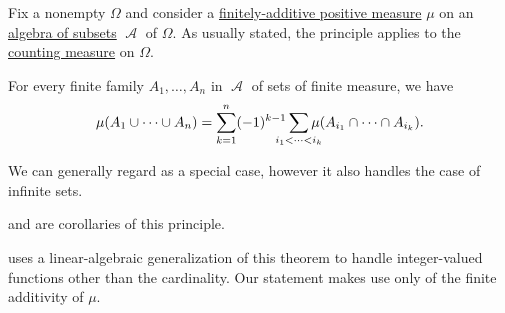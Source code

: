 \begin{theorem}\label{thm:inclusion_exclusion_principle}
  Fix a nonempty \( \Omega \) and consider a \hyperref[def:measure/positive]{finitely-additive positive measure} \( \mu \) on an \hyperref[def:algebra_of_subsets]{algebra of subsets} \( \mscrA \) of \( \Omega \). As usually stated, the principle applies to the \hyperref[def:counting_measure]{counting measure} on \( \Omega \).

  For every finite family \( A_1, \ldots, A_n \) in \( \mscrA \) of sets of finite measure, we have
  \begin{equation}\label{eq:thm:inclusion_exclusion_principle}
    \mu(A_1 \cup \cdots \cup A_n) = \sum_{k=1}^n (-1)^{k - 1} \sum_{\mathclap{i_1 < \cdots < i_k}} \mu(A_{i_1} \cap \cdots \cap A_{i_k}).
  \end{equation}
\end{theorem}
\begin{comments}
  \item We can generally regard  as a special case, however it also handles the case of infinite sets.

  \item {} and  are corollaries of this principle.

  \item {} uses a linear-algebraic generalization of this theorem to handle integer-valued functions other than the cardinality. Our statement makes use only of the finite additivity of \( \mu \).
\end{comments}
